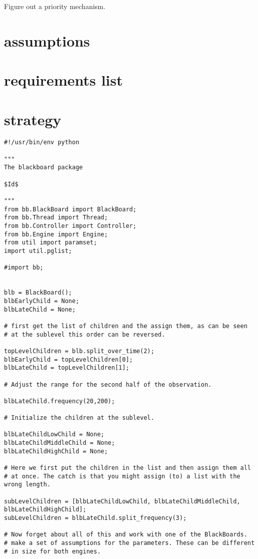 \documentclass[]{lofar}
\begin{document}
      Figure out a priority mechanism.

\newcommand{\dbappendix}[1]{\section{#1}}
\appendix

  \dbappendix{assumptions}
  \label{app:assumptions}\hypertarget{app:assumptions}{}


  \dbappendix{requirements list}
  \label{app:requirements-list}\hypertarget{app:requirements-list}{}


  \dbappendix{strategy}
  \label{app:start-script}\hypertarget{app:start-script}{}

\begin{Verbatim}[]
#!/usr/bin/env python

"""
The blackboard package

$Id$

"""
from bb.BlackBoard import BlackBoard;
from bb.Thread import Thread;
from bb.Controller import Controller;
from bb.Engine import Engine;
from util import paramset;
import util.pglist;

#import bb;


blb = BlackBoard();
blbEarlyChild = None;
blbLateChild = None;

# first get the list of children and the assign them, as can be seen
# at the sublevel this order can be reversed.

topLevelChildren = blb.split_over_time(2);
blbEarlyChild = topLevelChildren[0];
blbLateChild = topLevelChildren[1];

# Adjust the range for the second half of the observation.

blbLateChild.frequency(20,200);

# Initialize the children at the sublevel.

blbLateChildLowChild = None;
blbLateChildMiddleChild = None;
blbLateChildHighChild = None;

# Here we first put the children in the list and then assign them all
# at once. The catch is that you might assign (to) a list with the wrong length.

subLevelChildren = [blbLateChildLowChild, blbLateChildMiddleChild, blbLateChildHighChild];
subLevelChildren = blbLateChild.split_frequency(3);

# Now forget about all of this and work with one of the BlackBoards.
# make a set of assumptions for the parameters. These can be different
# in size for both engines.


\end{Verbatim}
\end{document}
